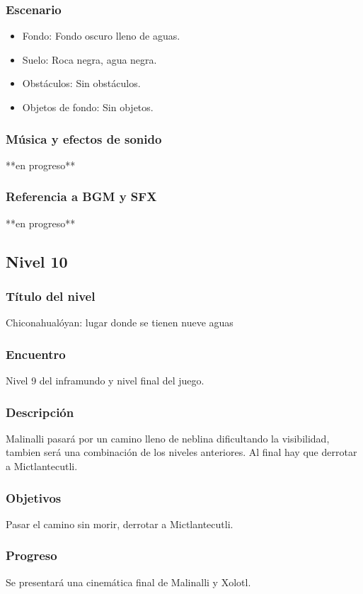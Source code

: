 \documentclass[11pt,letterpaper]{article}
\begin{document}
	\subsubsection{Escenario}
\begin{itemize} 
	\item Fondo: Fondo oscuro lleno de aguas.
	\item Suelo: Roca negra, agua negra.
	\item Obstáculos: Sin obstáculos.
	\item Objetos de fondo: Sin objetos.
\end{itemize}	
	\subsubsection{Música y efectos de sonido}
	**en progreso**
	\subsubsection{Referencia a BGM y SFX}
	**en progreso**
	
	
		\subsection{Nivel 10}
	\subsubsection{Título del nivel}
	Chiconahualóyan: lugar donde se tienen nueve aguas
	\subsubsection{Encuentro}
	Nivel 9 del inframundo y nivel final del juego.
	\subsubsection{Descripción}
	Malinalli pasará por un camino lleno de neblina dificultando la visibilidad, tambien será una combinación de los niveles anteriores. Al final hay que derrotar a Mictlantecutli.
	\subsubsection{Objetivos}
	Pasar el camino sin morir, derrotar a Mictlantecutli.
	\subsubsection{Progreso}
	Se presentará una cinemática final de Malinalli y Xolotl.
\end{document}
